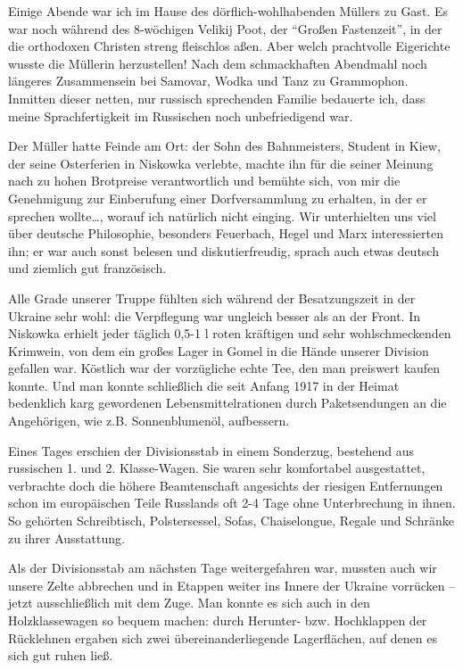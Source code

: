 \documentclass[a5paper,pagesize,10pt,twoside=true]{scrbook}
\begin{document}
Einige Abende war ich im Hause des dörflich-wohlhabenden Müllers zu Gast. Es war noch während des 8-wöchigen Velikij Poot, der \enquote{Großen Fastenzeit}, in der die orthodoxen Christen streng fleischlos aßen. Aber welch prachtvolle Eigerichte wusste die Müllerin herzustellen! Nach dem schmackhaften Abendmahl noch längeres Zusammensein bei Samovar, Wodka und Tanz zu Grammophon. Inmitten dieser netten, nur russisch sprechenden Familie bedauerte ich, dass meine Sprachfertigkeit im Russischen noch unbefriedigend war.

Der Müller hatte Feinde am Ort: der Sohn des Bahnmeisters, Student in Kiew, der seine Osterferien in Niskowka verlebte, machte ihn für die seiner Meinung nach zu hohen Brotpreise verantwortlich und bemühte sich, von mir die Genehmigung zur Einberufung einer Dorfversammlung zu erhalten, in der er sprechen wollte\dots, worauf ich natürlich nicht einging. Wir unterhielten uns viel über deutsche Philosophie, besonders Feuerbach, Hegel und Marx interessierten ihn; er war auch sonst belesen und diskutierfreudig, sprach auch etwas deutsch und ziemlich gut französisch.

Alle Grade unserer Truppe fühlten sich während der Besatzungszeit in der Ukraine sehr wohl: die Verpflegung war ungleich besser als an der Front. In Niskowka erhielt jeder täglich 0,5-1 l roten kräftigen und sehr wohlschmeckenden Krimwein, von dem ein großes Lager in Gomel in die Hände unserer Division gefallen war. Köstlich war der vorzügliche echte Tee, den man preiswert kaufen konnte. Und man konnte schließlich die seit Anfang 1917 in der Heimat bedenklich karg gewordenen Lebensmittelrationen durch Paketsendungen an die Angehörigen, wie z.B. Sonnenblumenöl, aufbessern.

Eines Tages erschien der Divisionsstab in einem Sonderzug, bestehend aus russischen 1. und 2. Klasse-Wagen. Sie waren sehr komfortabel ausgestattet, verbrachte doch die höhere Beamtenschaft angesichts der riesigen Entfernungen schon im europäischen Teile Russlands oft 2-4 Tage ohne Unterbrechung in ihnen. So gehörten Schreibtisch, Polstersessel, Sofas, Chaiselongue, Regale und Schränke zu ihrer Ausstattung.

Als der Divisionsstab am nächsten Tage weitergefahren war, mussten auch wir unsere Zelte abbrechen und in Etappen weiter ins Innere der Ukraine vorrücken -- jetzt ausschließlich mit dem Zuge. Man konnte es sich auch in den Holzklassewagen so bequem machen: durch Herunter- bzw. Hochklappen der Rücklehnen ergaben sich zwei übereinanderliegende Lagerflächen, auf denen es sich gut ruhen ließ.
\end{document}
